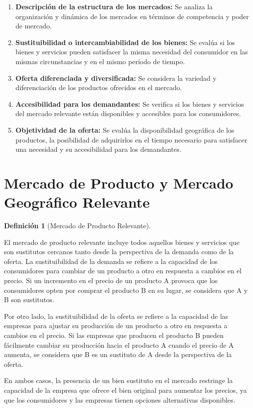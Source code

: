 \documentclass[
  a4paper,
]{article}
\theoremstyle{definition}
\newtheorem{definition}{Definición}[section]
\theoremstyle{remark}
\begin{document}
\begin{enumerate}
\def\labelenumi{\arabic{enumi}.}
\item
  \textbf{Descripción de la estructura de los mercados:} Se analiza la
  organización y dinámica de los mercados en términos de competencia y
  poder de mercado.
\item
  \textbf{Sustituibilidad o intercambiabilidad de los bienes:} Se evalúa
  si los bienes y servicios pueden satisfacer la misma necesidad del
  consumidor en las mismas circunstancias y en el mismo período de
  tiempo.
\item
  \textbf{Oferta diferenciada y diversificada:} Se considera la variedad
  y diferenciación de los productos ofrecidos en el mercado.
\item
  \textbf{Accesibilidad para los demandantes:} Se verifica si los bienes
  y servicios del mercado relevante están disponibles y accesibles para
  los consumidores.
\item
  \textbf{Objetividad de la oferta:} Se evalúa la disponibilidad
  geográfica de los productos, la posibilidad de adquirirlos en el
  tiempo necesario para satisfacer una necesidad y su accesibilidad para
  los demandantes.
\end{enumerate}

\hypertarget{mercado-de-producto-y-mercado-geogruxe1fico-relevante}{%
\section{Mercado de Producto y Mercado Geográfico
Relevante}\label{mercado-de-producto-y-mercado-geogruxe1fico-relevante}}

\begin{definition}[Mercado de Producto
Relevante]\protect\hypertarget{def-mercado-producto-relevante}{}\label{def-mercado-producto-relevante}

El mercado de producto relevante incluye todos aquellos bienes y
servicios que son sustitutos cercanos tanto desde la perspectiva de la
demanda como de la oferta. La sustituibilidad de la demanda se refiere a
la capacidad de los consumidores para cambiar de un producto a otro en
respuesta a cambios en el precio. Si un incremento en el precio de un
producto A provoca que los consumidores opten por comprar el producto B
en su lugar, se considera que A y B son sustitutos.

Por otro lado, la sustituibilidad de la oferta se refiere a la capacidad
de las empresas para ajustar su producción de un producto a otro en
respuesta a cambios en el precio. Si las empresas que producen el
producto B pueden fácilmente cambiar su producción hacia el producto A
cuando el precio de A aumenta, se considera que B es un sustituto de A
desde la perspectiva de la oferta.

En ambos casos, la presencia de un bien sustituto en el mercado
restringe la capacidad de la empresa que ofrece el bien original para
aumentar los precios, ya que los consumidores y las empresas tienen
opciones alternativas disponibles.

\end{definition}
\end{document}
